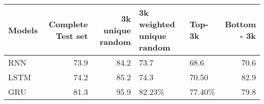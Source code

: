 \begin{table}
\centering
\label{tab1}
\begin{tabular}{lrrllr}
\toprule
Models &  Complete Test set &  3k unique random & 3k weighted unique random & Top-3k &  Bottom - 3k \\
\midrule
   RNN &               73.9 &              84.2 &                      73.7 &   68.6 &         70.6 \\
  LSTM &               74.2 &              85.2 &                      74.3 &  70.50 &         82.9 \\
   GRU &               81.3 &              95.9 &                    82.23\% & 77.40\% &         79.8 \\
\bottomrule
\end{tabular}
\end{table}
